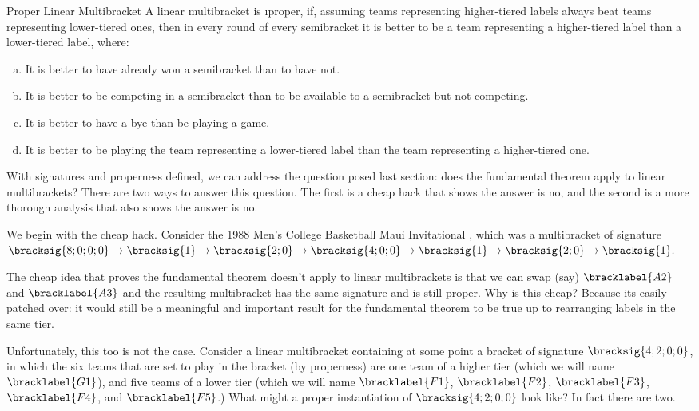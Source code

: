 {    \begin{definition}{Proper Linear Multibracket}{}
        A linear multibracket is \i{proper}, if, assuming teams representing higher-tiered labels always beat teams representing lower-tiered ones, then in every round of every semibracket it is better to be a team representing a higher-tiered label than a lower-tiered label, where:
        \begin{enumerate}[(a)]
            \item It is better to have already won a semibracket than to have not.
            \item It is better to be competing in a semibracket than to be available to a semibracket but not competing.
            \item It is better to have a bye than be playing a game.
            \item It is better to be playing the team representing a lower-tiered label than the team representing a higher-tiered one.
        \end{enumerate}
    \end{definition}

    With signatures and properness defined, we can address the question posed last section: does the fundamental theorem apply to linear multibrackets? There are two ways to answer this question. The first is a cheap hack that shows the answer is no, and the second is a more thorough analysis that also shows the answer is no.

    We begin with the cheap hack. Consider the 1988 Men's College Basketball Maui Invitational \cite{wiki_maui}, which was a multibracket of signature $\bracksig{8;0;0;0} \to \bracksig{1} \to \bracksig{2;0} \to \bracksig{4;0;0} \to \bracksig{1} \to \bracksig{2;0} \to \bracksig{1}.$


    The cheap idea that proves the fundamental theorem doesn't apply to linear multibrackets is that we can swap (say) $\bracklabel{A2}$ and $\bracklabel{A3}$ and the resulting multibracket has the same signature and is still proper. Why is this cheap? Because its easily patched over: it would still be a meaningful and important result for the fundamental theorem to be true up to rearranging labels in the same tier.

    Unfortunately, this too is not the case. Consider a linear multibracket containing at some point a bracket of signature $\bracksig{4;2;0;0}$, in which the six teams that are set to play in the bracket (by properness) are one team of a higher tier (which we will name $\bracklabel{G1}$), and five teams of a lower tier (which we will name $\bracklabel{F1}$, $\bracklabel{F2}$, $\bracklabel{F3}$, $\bracklabel{F4}$, and $\bracklabel{F5}$.) What might a proper instantiation of $\bracksig{4;2;0;0}$ look like? In fact there are two.

}
